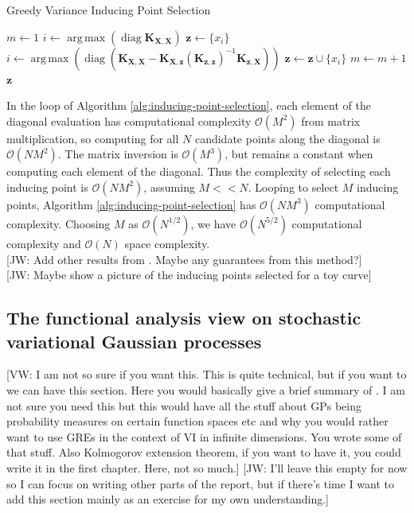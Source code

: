 \documentclass{article}
\newcommand{\jw}[1]{{\color{gray} [JW: #1]}}
\newcommand{\vw}[1]{{\color{green} [VW: #1]}}
\newcommand{\diag}{\operatorname{diag}}
\DeclareMathOperator*{\argmax}{arg\,max}
\numberwithin{equation}{section}
\begin{document}
\begin{algorithm}
\caption{Greedy Variance Inducing Point Selection}\label{alg:inducing-point-selection}
\begin{algorithmic}
\State $m \leftarrow 1$
 \State $i \leftarrow \argmax \left(\diag\mathbf{K}_{\mathbf{X}, \mathbf{X}}\right) $
 \State $\mathbf{z} \leftarrow \{x_i\}$
\State$i \leftarrow \argmax \left(\diag \left(\mathbf{K}_{\mathbf{X}, \mathbf{X}} - \mathbf{K}_{\mathbf{X}, \mathbf{z}} \left(\mathbf{K}_{\mathbf{z}, \mathbf{z}}\right)^{-1}\mathbf{K}_{\mathbf{z}, \mathbf{X}}\right)\right)$
 \State  $\mathbf{z} \leftarrow \mathbf{z} \cup \{x_i\}$
 \State  $m \leftarrow m+1$
\EndWhile
\State \Return $\mathbf{z}$
\end{algorithmic}
\end{algorithm}

In the loop of Algorithm \ref{alg:inducing-point-selection}, each element of the diagonal evaluation has computational complexity $\mathcal{O}(M^2)$ from matrix multiplication, so computing for all $N$ candidate points along the diagonal is $\mathcal{O}(NM^2)$.
The matrix inversion is $\mathcal{O}(M^3)$, but remains a constant when computing each element of the diagonal.
Thus the complexity of selecting each inducing point is $\mathcal{O}(NM^2)$, assuming $M << N$.
Looping to select $M$ inducing points, Algorithm \ref{alg:inducing-point-selection} has $\mathcal{O}(NM^3)$ computational complexity.
Choosing $M$ as $\mathcal{O}(N^{1/2})$, we have $\mathcal{O}(N^{5/2})$ computational complexity and $\mathcal{O}(N)$ space complexity.
\\\jw{Add other results from \cite{burt2020convergence}. Maybe any guarantees from this method?}
\\\jw{Maybe show a picture of the inducing points selected for a toy curve}

\subsection{The functional analysis view on stochastic variational Gaussian processes}
\vw{I am not so sure if you want this. This is quite technical, but if you want to we can have this section. Here you would basically give a brief summary of \cite{wynne2022variational}. I am not sure you need this but this would have all the stuff about GPs being probability measures on certain function spaces etc and why you would rather want to use GREs in the context of VI in infinite dimensions. You wrote some of that stuff. Also Kolmogorov extension theorem, if you want to have it, you could write it in the first chapter. Here, not so much.}
\jw{I'll leave this empty for now so I can focus on writing other parts of the report, but if there's time I want to add this section mainly as an exercise for my own understanding.}
\end{document}
